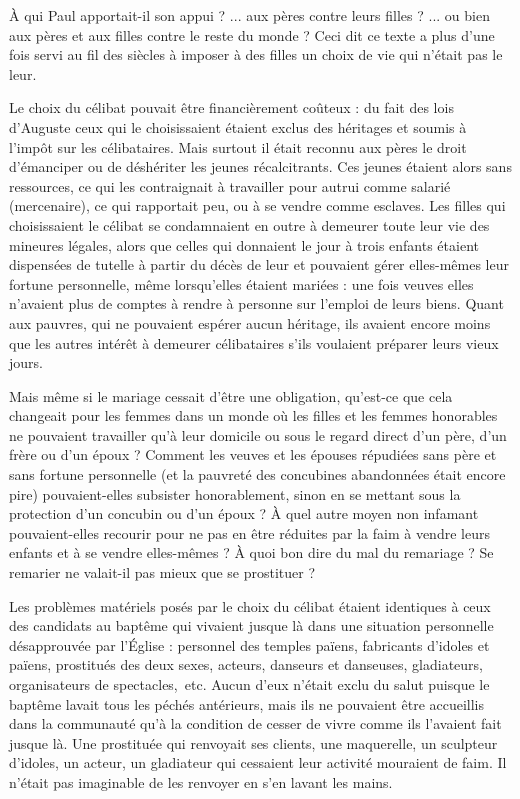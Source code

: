 À qui Paul apportait-il son appui ? ... aux pères contre leurs filles ? ... ou bien aux pères et aux filles contre le reste du monde ? Ceci dit ce texte a plus d'une fois servi au fil des siècles à imposer à des filles un choix de vie qui n'était pas le leur. 
 
 Le choix du célibat pouvait être financièrement coûteux : du fait des lois d'Auguste ceux qui le choisissaient étaient exclus des héritages et soumis à l'impôt sur les célibataires. Mais surtout il était reconnu aux pères le droit d'émanciper ou de déshériter les jeunes récalcitrants. Ces jeunes étaient alors sans ressources, ce qui les contraignait à travailler pour autrui comme salarié (mercenaire), ce qui rapportait peu, ou à se vendre comme esclaves. Les filles qui choisissaient le célibat se condamnaient en outre à demeurer toute leur vie des mineures légales, alors que celles qui donnaient le jour à trois enfants étaient dispensées de tutelle à partir du décès de leur  et pouvaient gérer elles-mêmes leur fortune personnelle, même lorsqu'elles étaient mariées : une fois veuves elles n'avaient plus de comptes à rendre à personne sur l'emploi de leurs biens. Quant aux pauvres, qui ne pouvaient espérer aucun héritage, ils avaient encore moins que les autres intérêt à demeurer célibataires s'ils voulaient préparer leurs vieux jours. 

 Mais même si le mariage cessait d'être une obligation, qu'est-ce que cela changeait pour les femmes dans un monde où les filles et les femmes honorables ne pouvaient travailler qu'à leur domicile ou sous le regard direct d'un père, d'un frère ou d'un époux ? Comment les veuves et les épouses répudiées sans père et sans fortune personnelle (et la pauvreté des concubines abandonnées était encore pire) pouvaient-elles subsister honorablement, sinon en se mettant sous la protection d'un concubin ou d'un époux ? À quel autre moyen non infamant pouvaient-elles recourir pour ne pas en être réduites par la faim à vendre leurs enfants et à se vendre elles-mêmes ? À quoi bon dire du mal du remariage ? Se remarier ne valait-il pas mieux que se prostituer ?

 Les problèmes matériels posés par le choix du célibat étaient identiques à ceux des candidats au baptême qui vivaient jusque là dans une situation personnelle désapprouvée par l'Église : personnel des temples païens, fabricants d'idoles et  païens, prostitués des deux sexes, acteurs, danseurs et danseuses, gladiateurs, organisateurs de spectacles,~etc. Aucun d'eux n'était exclu du salut puisque le baptême lavait tous les péchés antérieurs, mais ils ne pouvaient être accueillis dans la communauté qu'à la condition de cesser de vivre comme ils l'avaient fait jusque là. Une prostituée qui renvoyait ses clients, une maquerelle, un sculpteur d'idoles, un acteur, un gladiateur qui cessaient leur activité mouraient de faim. Il n'était pas imaginable de les renvoyer en s'en lavant les mains. 

